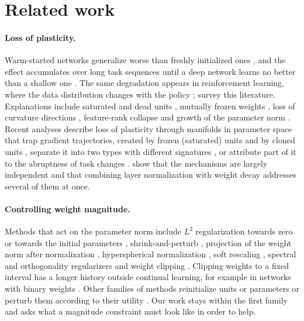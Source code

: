 \documentclass[11pt,a4paper]{article}
\begin{document}
\section{Related work}

\paragraph{Loss of plasticity.}
Warm-started networks generalize worse than freshly initialized ones \citep{ash2020warm,berariu2021study},
and the effect accumulates over long task sequences until a deep network learns no better than a shallow one
\citep{dohare2021continual,dohare2024loss}. The same degradation appears in reinforcement learning, where the
data distribution changes with the policy
\citep{nikishin2022primacy,lyle2022understanding,abbas2023loss,sokar2023dormant,juliani2024study};
\citet{klein2024survey} survey this literature. Explanations include saturated and dead units
\citep{sokar2023dormant,abbas2023loss}, mutually frozen weights \citep{zilly2021plasticity}, loss of
curvature directions \citep{lewandowski2023directions}, feature-rank collapse \citep{lyle2022understanding}
and growth of the parameter norm \citep{dohare2024loss,lyle2024disentangling}. Recent analyses describe loss
of plasticity through manifolds in parameter space that trap gradient trajectories, created by frozen
(saturated) units and by cloned units \citep{joudaki2026barriers}, separate it into two types with different
signatures \citep{wang2025dual}, or attribute part of it to the abruptness of task changes
\citep{liu2026gradually}. \citet{lyle2024disentangling} show that the mechanisms are largely independent and
that combining layer normalization with weight decay addresses several of them at once.

\paragraph{Controlling weight magnitude.}
Methods that act on the parameter norm include $L^2$ regularization towards zero or towards the initial
parameters \citep{kumar2023maintaining}, shrink-and-perturb \citep{ash2020warm}, projection of the weight norm
after normalization \citep{lyle2024normalization}, hyperspherical normalization \citep{lee2025hyperspherical},
soft rescaling \citep{oh2025soft}, spectral and orthogonality regularizers
\citep{lewandowski2025spectral,chung2024parseval} and weight clipping \citep{elsayed2024weight}.
Clipping weights to a fixed interval has a longer history outside continual learning, for example in
networks with binary weights \citep{courbariaux2015binaryconnect}. Other families of methods reinitialize
units or parameters \citep{dohare2024loss,sokar2023dormant,nikishin2022primacy,farias2025self,galashov2024nonstationary}
or perturb them according to their utility \citep{elsayed2024addressing}. Our work stays within the first
family and asks what a magnitude constraint must look like in order to help.
\end{document}
